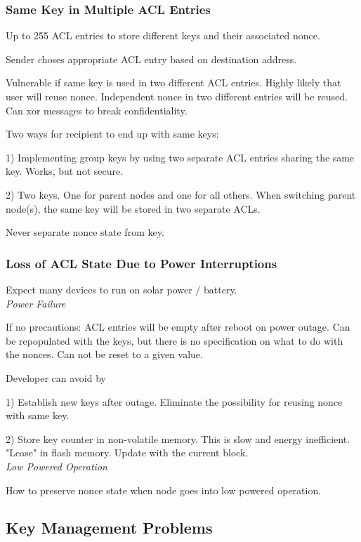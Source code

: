 \documentclass[10pt]{article}
\begin{document}
\subsubsection{Same Key in Multiple ACL Entries}

Up to 255 ACL entries to store different keys and their associated nonce.

Sender choses appropriate ACL entry based on destination address.


Vulnerable if same key is used in two different ACL entries. Highly likely that user will reuse nonce. Independent nonce in two different entries will be reused. Can xor messages to break confidentiality.


Two ways for recipient to end up with same keys:


1) Implementing group keys by using two separate ACL entries sharing the same key. Works, but not secure.

2) Two keys. One for parent nodes and one for all others. When switching parent node(s), the same key will be stored in two separate ACLs. 

Never separate nonce state from key.


\subsubsection{Loss of ACL State Due to Power Interruptions}

Expect many devices to run on solar power / battery.\\

\emph{Power Failure}

If no precautions: ACL entries will be empty after reboot on power outage. Can be repopulated with the keys, but there is no specification on what to do with the nonces. Can not be reset to a given value. 

Developer can avoid by

1) Establish new keys after outage. Eliminate the possibility for reusing nonce with same key.

2) Store key counter in non-volatile memory. This is slow and energy inefficient. "Lease" in flash memory. Update with the current block.\\

\emph{Low Powered Operation}

How to preserve nonce state when node goes into low powered operation.


\subsection{Key Management Problems}
\end{document}
